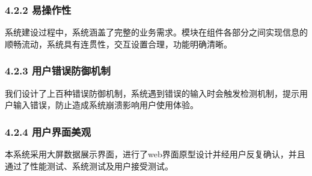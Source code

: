 \subsubsection{4.2.2 易操作性}
系统建设过程中，系统涵盖了完整的业务需求。模块在组件各部分之间实现信息的顺畅流动，系统具有连贯性，交互设置合理，功能明确清晰。
\subsubsection{4.2.3 用户错误防御机制}
我们设计了上百种错误防御机制，系统遇到错误的输入时会触发检测机制，提示用户输入错误，防止造成系统崩溃影响用户使用体验。
\subsubsection{4.2.4 用户界面美观}
本系统采用大屏数据展示界面，进行了web界面原型设计并经用户反复确认，并且通过了性能测试、系统测试及用户接受测试。
